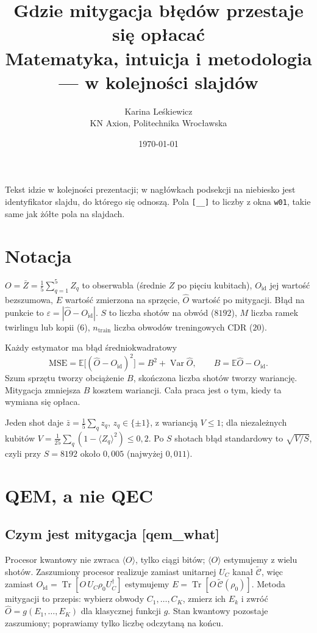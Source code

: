 \documentclass[11pt,a4paper]{article}
\title{\bfseries Gdzie mitygacja błędów przestaje się opłacać\\[4pt]
\large\normalfont Matematyka, intuicja i metodologia --- w kolejności slajdów}
\author{Karina Leśkiewicz\\\small KN Axion, Politechnika Wrocławska}
\date{\today}
\newcommand{\PH}{\colorbox{yellow!40}{\texttt{[\_\_]}}}
\newcommand{\slid}[1]{\hfill{\normalfont\small\ttfamily\color{axbluedk}[#1]}}
\newcommand{\ev}[1]{\langle #1\rangle}
\newcommand{\Oid}{O_{\mathrm{id}}}
\newcommand{\Var}{\operatorname{Var}}
\newcommand{\E}{\mathbb{E}}
\newcommand{\Tr}{\operatorname{Tr}}
\begin{document}
\maketitle

\noindent Tekst idzie w kolejności prezentacji; w nagłówkach podsekcji na niebiesko jest
identyfikator slajdu, do którego się odnoszą. Pola \PH{} to liczby z okna \texttt{w01}, takie
same jak żółte pola na slajdach.

\tableofcontents
\clearpage

\section*{Notacja}

$O=\bar Z=\frac15\sum_{q=1}^5Z_q$ to obserwabla (średnie $Z$ po pięciu kubitach), $\Oid$ jej
wartość bezszumowa, $E$ wartość zmierzona na sprzęcie, $\hat O$ wartość po mitygacji. Błąd na
punkcie to $\varepsilon=|\hat O-\Oid|$. $S$ to liczba shotów na obwód ($8192$), $M$ liczba ramek
twirlingu lub kopii ($6$), $n_{\text{train}}$ liczba obwodów treningowych CDR ($20$).

Każdy estymator ma błąd średniokwadratowy
\[
  \mathrm{MSE}=\E\big[(\hat O-\Oid)^2\big]=B^2+\Var\hat O,\qquad B=\E\hat O-\Oid .
\]
Szum sprzętu tworzy obciążenie $B$, skończona liczba shotów tworzy wariancję. Mitygacja
zmniejsza $B$ kosztem wariancji. Cała praca jest o tym, kiedy ta wymiana się opłaca.

Jeden shot daje $\bar z=\frac15\sum_qz_q$, $z_q\in\{\pm1\}$, z wariancją $V\le1$; dla
niezależnych kubitów $V=\frac1{25}\sum_q(1-\ev{Z_q}^2)\le0{,}2$. Po $S$ shotach błąd
standardowy to $\sqrt{V/S}$, czyli przy $S=8192$ około $0{,}005$ (najwyżej $0{,}011$).

\section{QEM, a nie QEC}

\subsection{Czym jest mitygacja \slid{qem\_what}}

Procesor kwantowy nie zwraca $\ev{O}$, tylko ciągi bitów; $\ev{O}$ estymujemy z wielu shotów.
Zaszumiony procesor realizuje zamiast unitarnej $U_C$ kanał $\tilde{\mathcal C}$, więc zamiast
$\Oid=\Tr[O\,U_C\rho_0U_C^\dagger]$ estymujemy $E=\Tr[O\,\tilde{\mathcal C}(\rho_0)]$. Metoda
mitygacji to przepis: wybierz obwody $C_1,\dots,C_K$, zmierz ich $E_k$ i zwróć
$\hat O=g(E_1,\dots,E_K)$ dla klasycznej funkcji $g$. Stan kwantowy pozostaje zaszumiony;
poprawiamy tylko liczbę odczytaną na końcu.
\end{document}
